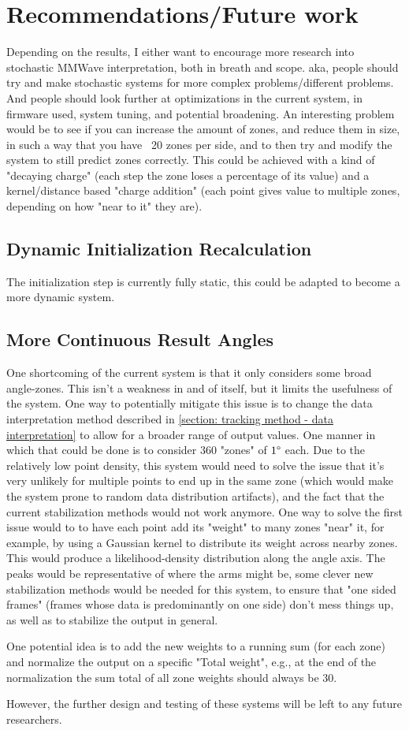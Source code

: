 \section{Recommendations/Future work}
\label{section: conclusion - future work}
Depending on the results, I either want to encourage more research into stochastic MMWave interpretation, both in breath and scope. aka, people should try and make stochastic systems for more complex problems/different problems. And people should look further at optimizations in the current system, in firmware used, system tuning, and potential broadening.
An interesting problem would be to see if you can increase the amount of zones, and reduce them in size, in such a way that you have ~20 zones per side, and to then try and modify the system to still predict zones correctly.
This could be achieved with a kind of "decaying charge" (each step the zone loses a percentage of its value) and a kernel/distance based "charge addition" (each point gives value to multiple zones, depending on how "near to it" they are).


\subsection{Dynamic Initialization Recalculation}
The initialization step is currently fully static, this could be adapted to become a more dynamic system.

\subsection{More Continuous Result Angles}
One shortcoming of the current system is that it only considers some broad angle-zones.
This isn't a weakness in and of itself, but it limits the usefulness of the system.
One way to potentially mitigate this issue is to change the data interpretation method described in \cref{section: tracking method - data interpretation} to allow for a broader range of output values.
One manner in which that could be done is to consider 360 "zones" of $1\degree$ each. 
Due to the relatively low point density, this system would need to solve the issue that it's very unlikely for multiple points to end up in the same zone (which would make the system prone to random data distribution artifacts), and the fact that the current stabilization methods would not work anymore.
One way to solve the first issue would to to have each point add its "weight" to many zones "near" it, for example, by using a Gaussian kernel to distribute its weight across nearby zones.
This would produce a likelihood-density distribution along the angle axis.
The peaks would be representative of where the arms might be, some clever new stabilization methods would be needed for this system, to ensure that "one sided frames" (frames whose data is predominantly on one side) don't mess things up, as well as to stabilize the output in general.

One potential idea is to add the new weights to a running sum (for each zone) and normalize the output on a specific "Total weight", e.g., at the end of the normalization the sum total of all zone weights should always be 30.

However, the further design and testing of these systems will be left to any future researchers.